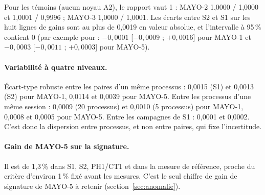 \F{} Pour les témoins (aucun noyau A2), le rapport vaut 1 : MAYO-2  1,0000 / 1,0000 et  1,0001 / 0,9996 ; MAYO-3  1,0000 / 1,0001. Les écarts entre S2 et S1 sur les huit lignes de gains sont au plus de 0,0019 en valeur absolue, et l'intervalle à 95\,\% contient 0 (par exemple pour  : $-0{,}0001$ [$-0{,}0009$ ; $+0{,}0016$] pour MAYO-1 et $-0{,}0003$ [$-0{,}0011$ ; $+0{,}0003$] pour MAYO-5).

\paragraph{Variabilité à quatre niveaux.} Écart-type robuste entre les paires d'un même processus : 0,0015 (S1) et 0,0013 (S2) pour MAYO-1, 0,0114 et 0,0039 pour MAYO-5. Entre les processus d'une même session : 0,0009 (20 processus) et 0,0010 (5 processus) pour MAYO-1, 0,0008 et 0,0005 pour MAYO-5. Entre les campagnes de S1 : 0,0001 et 0,0002. C'est donc la dispersion entre processus, et non entre paires, qui fixe l'incertitude.

\paragraph{Gain de MAYO-5 sur la signature.} \F{} Il est de 1,3\,\% dans S1, S2, PH1/CT1 et dans la mesure de référence, proche du critère d'environ 1\,\% fixé avant les mesures. C'est le seul chiffre de gain de signature de MAYO-5 à retenir (section~\ref{sec:anomalie}).

